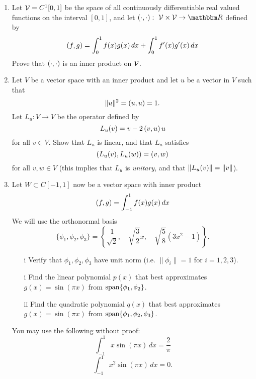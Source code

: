 
\begin{enumerate}
\item Let ${\cal V} = C^1[0,1]$ be the space of all continuously differentiable real valued functions on the interval $[0,1]$, and let $\displaystyle{\ip{\cdot,\cdot}:\mbox{ }\CV\times\CV\rightarrow\R}$ defined by 
\[
\left( f,g \right) = \int_0^1 f(x) g(x) \, dx + \int_0^1 f'(x) g'(x) \, dx
\]
Prove that $\left( \cdot,\cdot \right)$  is an inner product on ${\cal V}$.
\item Let $V$ be a vector space with an inner product and let $u$ be a vector in $V$ such that
\[
\|u\|^2 = (u,u) = 1.
\]
Let $ L_u:V \rightarrow V$ be the operator defined by
\[
 L_u(v)=v-2\left( v,u \right) u 
\]
for all $v \in V$. Show that $L_u$ is linear, and that $L_u$ satisfies 
$$\left( L_u(v),L_u(w) \right)= \left( v,w \right)$$ 
for all $v,w \in V$ (this implies that $L_u$ is \emph{unitary}, and that $\|L_u(v)\| = \|v\|$).  
\\
\item Let $W\subset C[-1,1]$ now be a vector space with inner product 
\[
\displaystyle{\left( f,g \right) = \int_{-1}^1 f(x) g(x) \, dx }
\]
We will use the orthonormal basis
\[
\{\phi_1, \phi_2, \phi_3\}= \left\{\frac{1}{\sqrt{2}}, \quad \sqrt{\frac{3}{2}}x, \quad \sqrt{\frac{5}{8}}(3x^2 - 1)\right\}.
\] 
\begin{itemize}
\item[i] Verify that $\phi_1,\phi_2,\phi_3$ have unit norm (i.e. $\|\phi_i\| = 1$ for $i = 1,2,3$).  
\item[i] Find the linear polynomial $p(x)$ that best approximates $g(x)= \sin(\pi x)$ from ${\rm span}\{\phi_1, \phi_2\}$. 
\item[ii] Find the quadratic polynomial $q(x)$ that best approximates $g(x)= \sin(\pi x)$ from ${\rm span}\{\phi_1, \phi_2, \phi_3\}$. 
\end{itemize}
You may use the following without proof:
\[
\int_{-1}^1 x \sin(\pi x) \, dx= \frac{2}{\pi}
\] 
\[
\int_{-1}^1 x^2 \sin(\pi x) \, dx= 0.
\]

\end{enumerate}




